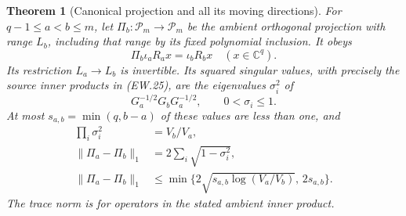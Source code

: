 \documentclass[11pt]{article}
\newtheorem{theorem}{Theorem}[section]
\newcommand{\C}{\mathbb C}
\begin{document}
\begin{theorem}[Canonical projection and all its moving directions]
For $q-1\le a<b\le m$, let
$\Pi_b:\mathcal P_m\to\mathcal P_m$ be the ambient orthogonal
projection with range $L_b$, including that range by its fixed
polynomial inclusion. It obeys
\[
 \boxed{\Pi_b\iota_aR_ax=\iota_bR_bx\quad(x\in\C^q).}       \tag{EW.26}
\]
Its restriction $L_a\to L_b$ is invertible. Its squared singular
values, with precisely the source inner products in (EW.25), are
the eigenvalues $\sigma_i^2$ of
\[
 G_a^{-1/2}G_bG_a^{-1/2},\qquad0<\sigma_i\le1.
                                                               \tag{EW.27}
\]
At most $s_{a,b}=\min(q,b-a)$ of these values are less than one,
and
\[
 \begin{split}
 \prod_i\sigma_i^2&=V_b/V_a,\\
 \|\Pi_a-\Pi_b\|_1
 &=2\sum_i\sqrt{1-\sigma_i^2},\\
 \|\Pi_a-\Pi_b\|_1
 &\le\min\{2\sqrt{s_{a,b}\log(V_a/V_b)},\,2s_{a,b}\}.
 \end{split}                                                   \tag{EW.28}
\]
The trace norm is for operators in the stated ambient inner product.
\end{theorem}
\end{document}
